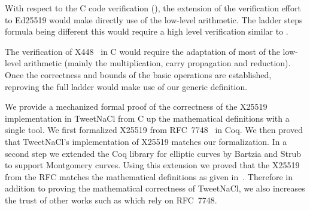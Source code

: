 With respect to the C code verification (), the extension of
the verification effort to Ed25519 would make directly use of the low-level
arithmetic. The ladder steps formula being different this would require a high
level verification similar to .

The verification of \eg X448~\cite{cryptoeprint:2015:625,rfc7748} in C would
require the adaptation of most of the low-level arithmetic (mainly the
multiplication, carry propagation and reduction).
Once the correctness and bounds of the basic operations are established,
reproving the full ladder would make use of our generic definition.

We provide a mechanized formal proof of the correctness of the X25519
implementation in TweetNaCl from C up the mathematical definitions with a single tool.
We first formalized X25519 from RFC~7748~\cite{rfc7748} in Coq.
We then proved that TweetNaCl's implementation of X25519 matches our formalization.
In a second step we extended the Coq library for elliptic curves \cite{BartziaS14}
by Bartzia and Strub to support Montgomery curves.
Using this extension we proved that the X25519 from the RFC matches the
mathematical definitions as given in~\cite[Sec.~2]{Ber06}.
Therefore in addition to proving the mathematical correctness of TweetNaCl,
we also increases the trust of other works such as
\cite{zinzindohoue2017hacl,Erbsen2016SystematicSO} which rely on RFC~7748.
